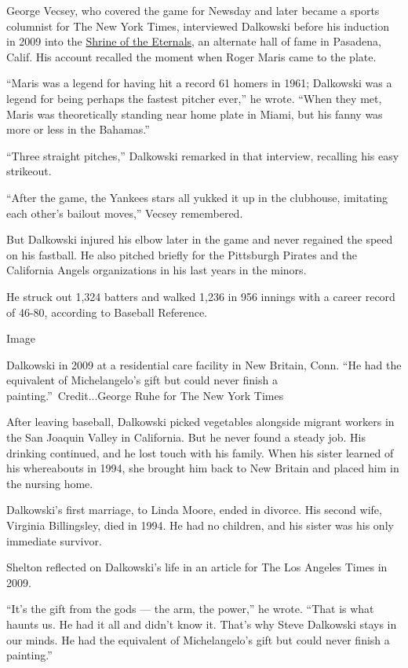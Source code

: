 George Vecsey, who covered the game for Newsday and later became a
sports columnist for The New York Times, interviewed Dalkowski before
his induction in 2009 into the
\href{http://www.baseballreliquary.org/awards/shrine-of-the-eternals/}{Shrine
of the Eternals}, an alternate hall of fame in Pasadena, Calif. His
account recalled the moment when Roger Maris came to the plate.

``Maris was a legend for having hit a record 61 homers in 1961;
Dalkowski was a legend for being perhaps the fastest pitcher ever,'' he
wrote. ``When they met, Maris was theoretically standing near home plate
in Miami, but his fanny was more or less in the Bahamas.''

``Three straight pitches,'' Dalkowski remarked in that interview,
recalling his easy strikeout.

``After the game, the Yankees stars all yukked it up in the clubhouse,
imitating each other's bailout moves,'' Vecsey remembered.

But Dalkowski injured his elbow later in the game and never regained the
speed on his fastball. He also pitched briefly for the Pittsburgh
Pirates and the California Angels organizations in his last years in the
minors.

He struck out 1,324 batters and walked 1,236 in 956 innings with a
career record of 46-80, according to Baseball Reference.

Image

Dalkowski in 2009 at a residential care facility in New Britain, Conn.
``He had the equivalent of Michelangelo's gift but could never finish a
painting.''~Credit...George Ruhe for The New York Times

After leaving baseball, Dalkowski picked vegetables alongside migrant
workers in the San Joaquin Valley in California. But he never found a
steady job. His drinking continued, and he lost touch with his family.
When his sister learned of his whereabouts in 1994, she brought him back
to New Britain and placed him in the nursing home.

Dalkowski's first marriage, to Linda Moore, ended in divorce. His second
wife, Virginia Billingsley, died in 1994. He had no children, and his
sister was his only immediate survivor.

Shelton reflected on Dalkowski's life in an article for The Los Angeles
Times in 2009.

``It's the gift from the gods --- the arm, the power,'' he wrote. ``That
is what haunts us. He had it all and didn't know it. That's why Steve
Dalkowski stays in our minds. He had the equivalent of Michelangelo's
gift but could never finish a painting.''

